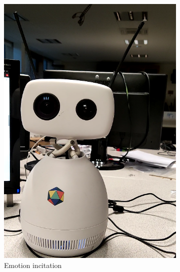 \documentclass[a4paper,french]{article}
\begin{document}
\begin{figure}[!ht]
\begin{subfigure}{0.25\textwidth}
        \includegraphics[width=\textwidth]{figures/incitation.png}
        \caption{Emotion incitation}
        \label{incitation}
    \end{subfigure}
    \begin{subfigure}{0.25\textwidth}

\end{subfigure}
\end{figure}
\end{document}

